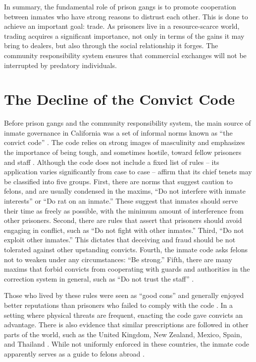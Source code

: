 \documentclass[a4paper, 12pt]{article}
\begin{document}
In summary, the fundamental role of prison gangs is to promote cooperation between inmates who have strong reasons to distrust each other. This is done to achieve an important goal: trade. As prisoners live in a resource-scarce world, trading acquires a significant importance, not only in terms of the gains it may bring to dealers, but also through the social relationship it forges. The community responsibility system ensures that commercial exchanges will not be interrupted by predatory individuals. 

\section{The Decline of the Convict Code}
\label{sec:convictcode} 

\noindent
Before prison gangs and the community responsibility system, the main source of inmate governance in California was a set of informal norms known as ``the convict code'' \citep{irwin1962thieves,irwin1970felon,jacobs1977stateville,sykes1960inmate}. The code relies on strong images of masculinity \citep{freeman1999correctional,hua2005patterns} and emphasizes the importance of being tough, and sometimes hostile, toward fellow prisoners and staff \citep[pp. 369]{cole2013criminal}. Although the code does not include a fixed list of rules -- its application varies significantly from case to case  \citep[e.g.][]{akers1977prisonization,copes2013accounting,trammell2012enforcing} -- \citet[p. 5--9]{sykes1960inmate} affirm that its chief tenets may be classified into five groups. First, there are norms that suggest caution to felons, and are usually condensed in the maxims, ``Do not interfere with inmate interests'' or ``Do rat on an inmate.'' These suggest that inmates should serve their time as freely as possible, with the minimum amount of interference from other prisoners. Second, there are rules that assert that prisoners should avoid engaging in conflict, such as ``Do not fight with other inmates.'' Third, ``Do not exploit other inmates.'' This dictates that deceiving and fraud should be not tolerated against other upstanding convicts. Fourth, the inmate code asks felons not to weaken under any circumstances: ``Be strong.'' Fifth, there are many maxims that forbid convicts from cooperating with guards and authorities in the correction system in general, such as ``Do not trust the staff'' \citep[p. 525]{sutherland1992principles}. 

Those who lived by these rules were seen as ``good cons'' and generally enjoyed better reputations than prisoners who failed to comply with the code \citep{copes2013accounting,crewe2005codes,liebling2012prisonlife}. In a setting where physical threats are frequent, enacting the code gave convicts an advantage. There is also evidence that similar prescriptions are followed in other parts of the world, such as the United Kingdom, New Zealand, Mexico, Spain, and Thailand \citep{akers1977prisonization,sirisutthidacha2014patterns,winfree2002prisoner}. While not uniformly enforced in these countries, the inmate code apparently serves as a guide to felons abroad \citep[p. 843]{copes2013accounting}.
\end{document}
